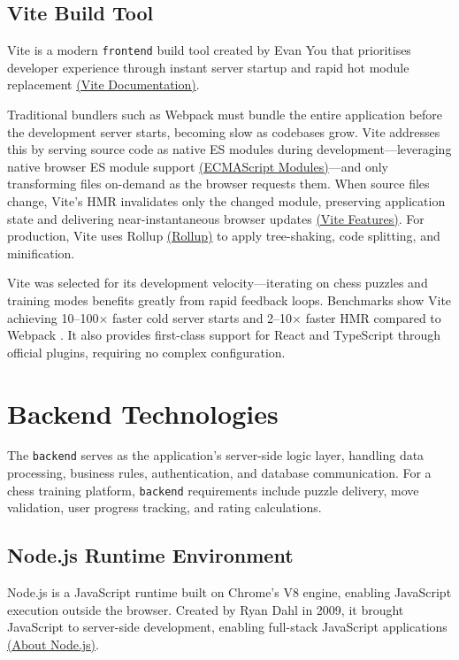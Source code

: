 \subsection*{Vite Build Tool}

Vite is a modern \texttt{frontend} build tool created by Evan You that prioritises developer experience through instant server startup and rapid hot module replacement \href{https://vitejs.dev/}{(Vite Documentation)}.

Traditional bundlers such as Webpack must bundle the entire application before the development server starts, becoming slow as codebases grow. Vite addresses this by serving source code as native ES modules during development---leveraging native browser ES module support \href{https://tc39.es/ecma262/}{(ECMAScript Modules)}---and only transforming files on-demand as the browser requests them. When source files change, Vite's HMR invalidates only the changed module, preserving application state and delivering near-instantaneous browser updates \href{https://vitejs.dev/guide/features.html}{(Vite Features)}. For production, Vite uses Rollup \href{https://rollupjs.org/}{(Rollup)} to apply tree-shaking, code splitting, and minification.

Vite was selected for its development velocity---iterating on chess puzzles and training modes benefits greatly from rapid feedback loops. Benchmarks show Vite achieving 10--100$\times$ faster cold server starts and 2--10$\times$ faster HMR compared to Webpack \cite{vite_comparison}. It also provides first-class support for React and TypeScript through official plugins, requiring no complex configuration.

\section{Backend Technologies}

The \texttt{backend} serves as the application's server-side logic layer, handling data processing, business rules, authentication, and database communication. For a chess training platform, \texttt{backend} requirements include puzzle delivery, move validation, user progress tracking, and rating calculations.

\subsection*{Node.js Runtime Environment}

Node.js is a JavaScript runtime built on Chrome's V8 engine, enabling JavaScript execution outside the browser. Created by Ryan Dahl in 2009, it brought JavaScript to server-side development, enabling full-stack JavaScript applications \href{https://nodejs.org/en/about/}{(About Node.js)}.

